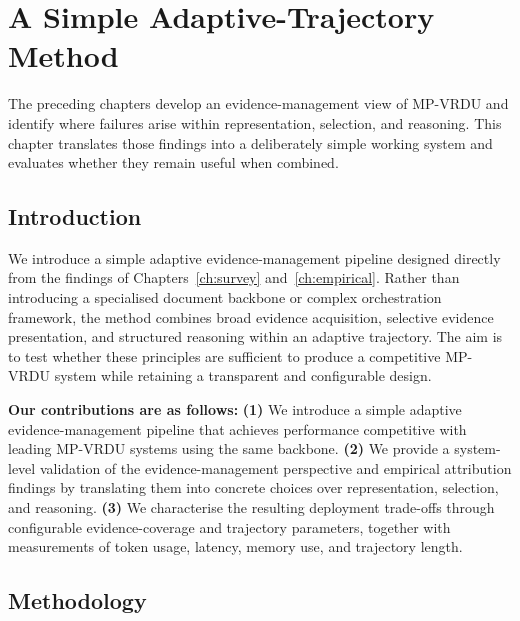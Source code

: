 \chapter{A Simple Adaptive-Trajectory Method}
\label{ch:simple_method}

The preceding chapters develop an evidence-management view of MP-VRDU and identify where failures arise within representation, selection, and reasoning. This chapter translates those findings into a deliberately simple working system and evaluates whether they remain useful when combined.

\section{Introduction}
\label{sec:simple_method_intro}

We introduce a simple adaptive evidence-management pipeline designed directly from the findings of Chapters~\ref{ch:survey} and~\ref{ch:empirical}. Rather than introducing a specialised document backbone or complex orchestration framework, the method combines broad evidence acquisition, selective evidence presentation, and structured reasoning within an adaptive trajectory. The aim is to test whether these principles are sufficient to produce a competitive MP-VRDU system while retaining a transparent and configurable design.

\textbf{Our contributions are as follows:} \textbf{(1)} We introduce a simple adaptive evidence-management pipeline that achieves performance competitive with leading MP-VRDU systems using the same backbone. \textbf{(2)} We provide a system-level validation of the evidence-management perspective and empirical attribution findings by translating them into concrete choices over representation, selection, and reasoning. \textbf{(3)} We characterise the resulting deployment trade-offs through configurable evidence-coverage and trajectory parameters, together with measurements of token usage, latency, memory use, and trajectory length.

\section{Methodology}
\label{sec:simple_adaptive_method}

